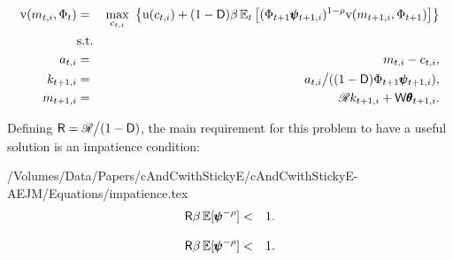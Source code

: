 \documentclass[titlepage]{./econtex}
\begin{document}
\begin{eqnarray}
    \mathrm{v}({m}_{t,i},\Phi_t) & = & \max_{c_{t,i}} ~ \big\{ {\mathrm{u}}(c_{t,i}) + (1-\mathsf{D}) \beta      \nonumber
                                      \operatorname{\mathbb{E}}_{t}\big[ (\Phi_{t+1} \pmb{\psi}_{t+1,i})^{1-\rho}\mathrm{v}(m_{t+1,i},\Phi_{t+1})\big] \big\}
    \label{eq:scaledv}
\\  & \mbox{s.t.} &
\\    a_{t,i}   & = & m_{t,i} - c_{t,i}, \nonumber
\\    k_{t+1,i} & = & a_{t,i} \big/( (1-\mathsf{D}) \Phi_{t+1} \pmb{\psi}_{t+1,i} ),  \nonumber
\\    m_{t+1,i} & = & \mathscr{R} k_{t+1,i} + \mathsf{W} \pmb{\theta}_{t+1,i}.  \nonumber
\end{eqnarray}
 
Defining $\mathsf{R} = \mathscr{R}\big/(1-\mathsf{D})$, the main requirement for this problem to have a useful solution is an impatience condition: 

\begin{verbatimwrite}{/Volumes/Data/Papers/cAndCwithStickyE/cAndCwithStickyE-AEJM/Equations/impatience.tex}
\begin{eqnarray*}
  \label{eq:impatience}
  \mathsf{R} \beta  \operatorname{\mathbb{E}}[ \pmb{\psi}^{-\rho}]  & < & 1.
\end{eqnarray*}
\end{verbatimwrite}
\begin{eqnarray*}
  \label{eq:impatience}
  \mathsf{R} \beta  \operatorname{\mathbb{E}}[ \pmb{\psi}^{-\rho}]  & < & 1.
\end{eqnarray*}
 
\end{document}
